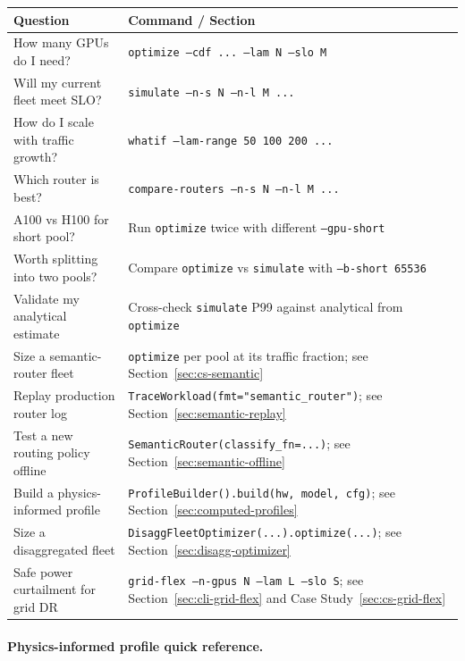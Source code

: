 \documentclass[11pt,a4paper]{article}
\begin{document}
\begin{center}
\begin{tabular}{lp{9.5cm}}
\toprule
\textbf{Question} & \textbf{Command / Section} \\
\midrule
How many GPUs do I need? & \texttt{optimize --cdf ... --lam N --slo M} \\
Will my current fleet meet SLO? & \texttt{simulate --n-s N --n-l M ...} \\
How do I scale with traffic growth? & \texttt{whatif --lam-range 50 100 200 ...} \\
Which router is best? & \texttt{compare-routers --n-s N --n-l M ...} \\
A100 vs H100 for short pool? & Run \texttt{optimize} twice with different
  \texttt{--gpu-short} \\
Worth splitting into two pools? & Compare \texttt{optimize} vs \texttt{simulate}
  with \texttt{--b-short 65536} \\
Validate my analytical estimate & Cross-check \texttt{simulate} P99 against
  analytical from \texttt{optimize} \\
Size a semantic-router fleet & \texttt{optimize} per pool at its traffic fraction;
  see Section~\ref{sec:cs-semantic} \\
Replay production router log & \texttt{TraceWorkload(fmt="semantic\_router")};
  see Section~\ref{sec:semantic-replay} \\
Test a new routing policy offline & \texttt{SemanticRouter(classify\_fn=...)};
  see Section~\ref{sec:semantic-offline} \\
Build a physics-informed profile & \texttt{ProfileBuilder().build(hw, model, cfg)};
  see Section~\ref{sec:computed-profiles} \\
Size a disaggregated fleet & \texttt{DisaggFleetOptimizer(...).optimize(...)};
  see Section~\ref{sec:disagg-optimizer} \\
Safe power curtailment for grid DR & \texttt{grid-flex --n-gpus N --lam L --slo S};
  see Section~\ref{sec:cli-grid-flex} and Case Study~\ref{sec:cs-grid-flex} \\
\bottomrule
\end{tabular}
\end{center}

\paragraph{Physics-informed profile quick reference.}
\end{document}
